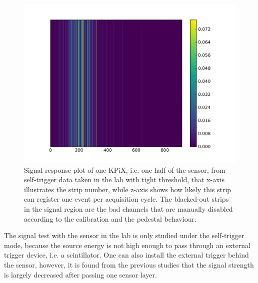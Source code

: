 \documentclass[journal]{IEEEtran}
\begin{document}
\begin{figure}[!ht]%
  \centering
  \includegraphics[width=1.0\linewidth]{pics/2018_07_13_16_34_20_strip_map_left.png}
  \caption{
  Signal response plot of one KPiX, i.e. one half of the sensor, from self-trigger data taken in the lab with tight threshold,
  that x-axis illustrates the strip number, while z-axis shows how likely this strip can register one event per acquisition cycle.
  The blacked-out strips in the signal region are the bad channels that are manually disabled according to the calibration and the pedestal behaviour.
  }%
\label{fig:lab2}%
\end{figure}

The signal test with the sensor in the lab is only studied under the self-trigger mode,
because the source energy is not high enough to pass through an external trigger device, i.e. a scintillator.
One can also install the external trigger behind the sensor, however, it is found from the previous studies that the signal strength is largely decreased after passing one sensor layer.
\end{document}
